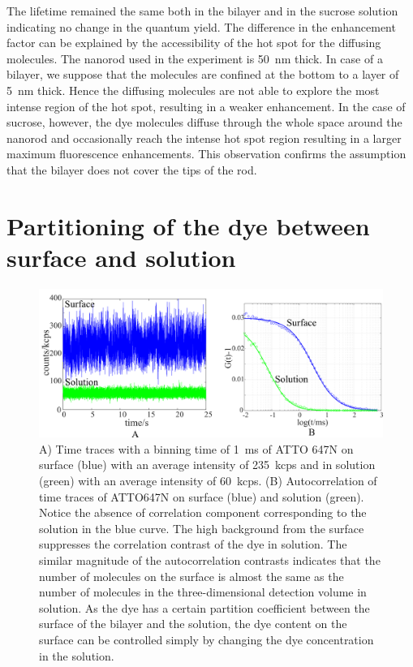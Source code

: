 \documentclass[11pt,a4paper,onecolumn]{article}
\begin{document}
The lifetime remained the same both in the bilayer and in the sucrose solution indicating no change in the quantum yield.
The difference in the enhancement factor can be explained by the accessibility of the hot spot for the diffusing molecules.
The nanorod used in the experiment is \SI{50}{\nm} thick.
In case of a bilayer, we suppose that the molecules are confined at the bottom to a layer of \SI{5}{\nm} thick.
Hence the diffusing molecules are not able to explore the most intense region of the hot spot, resulting in a weaker enhancement.
In the case of sucrose, however, the dye molecules diffuse through the whole space around the nanorod and occasionally reach the intense hot spot region resulting in a larger maximum fluorescence enhancements.
This observation confirms the assumption that the bilayer does not cover the tips of the rod.\\

\newpage
\section{Partitioning of the dye between surface and solution}
\begin{figure}[ht]
  \centering
  \includegraphics[width=\textwidth]{surf_soln.png}
  \makeatletter
  \renewcommand{\fnum@figure}{\figurename~S\thefigure}
  \makeatother{}
  \caption{A) Time traces with a binning time of \SI{1}{\ms} of ATTO 647N on surface (blue) with an average intensity of \SI{235}{ kcps} and in solution (green) with an average intensity of \SI{60}{ kcps}.
  (B) Autocorrelation of time traces of ATTO647N on surface (blue) and solution (green).
  Notice the absence of correlation component corresponding to the solution in the blue curve.
  The high background from the surface suppresses the correlation contrast of the dye in solution.
  The similar magnitude of the autocorrelation contrasts indicates that the number of molecules on the surface is almost the same as the number of molecules in the three-dimensional detection volume in solution.
  As the dye has a certain partition coefficient between the surface of the bilayer and the solution, the dye content on the surface can be controlled simply by changing the dye concentration in the solution.}
  \label{SIfig:surf-soln}
\end{figure}

\pagebreak

\end{document}
